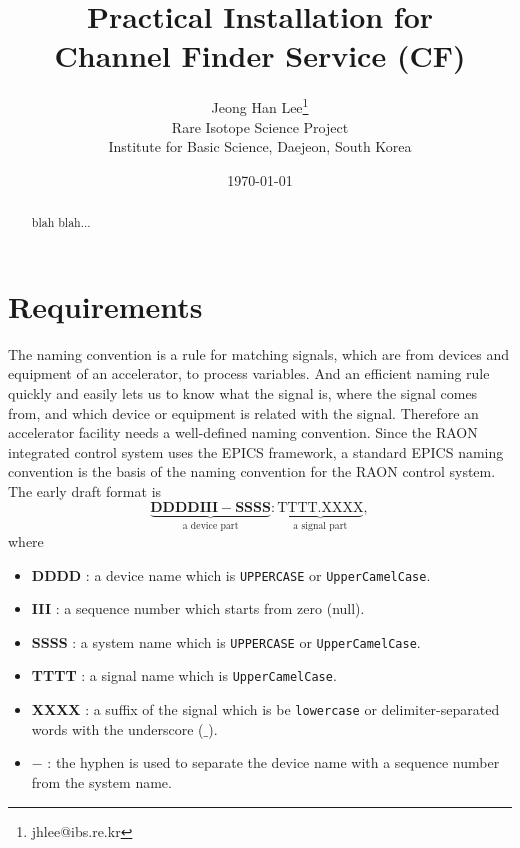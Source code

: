 \documentclass[11pt
  , a4paper
  , article
  , oneside
]{memoir}
\begin{document}
\newcommand{\technumber}{
  RAON Control-Document Series\\
  Revision : v0.2,   Release : --, 2014}
\title{\textbf{Practical Installation for \\Channel Finder Service (CF)}}

\author{Jeong Han Lee\thanks{jhlee@ibs.re.kr} \\
  Rare Isotope Science Project\\
  Institute for Basic Science, Daejeon, South Korea
}
\date{\today}

\renewcommand{\maketitlehooka}{\begin{flushright}\textsf{\technumber}\end{flushright}}

\maketitle

\begin{abstract}
blah blah...
\end{abstract}



\chapter{Requirements}

The naming convention is a rule for matching signals, which are from devices and equipment of an accelerator, to process variables. And an efficient naming rule quickly and easily lets us to know what the signal is, where the signal comes from, and which device or equipment is related with the signal. Therefore an accelerator facility needs a well-defined naming convention. Since the RAON integrated control system uses the EPICS framework, a standard EPICS naming convention is the basis of the naming convention for the RAON control system. The early draft format is
\begin{equation*}
\underbrace{\mathbf{DDDDIII-SSSS}}_\text{a device part}\mathbf{:}\underbrace{\mathrm{TTTT.XXXX}}_\text{a signal part},
\end{equation*} 
where 

\begin{itemize}
\item \textbf{DDDD} : a device name which is \texttt{UPPERCASE} or \texttt{UpperCamelCase}. 
\item \textbf{III}  : a sequence number which starts from zero (null). 
\item \textbf{SSSS} : a system name which is \texttt{UPPERCASE} or \texttt{UpperCamelCase}.
\item \textbf{TTTT} : a signal name which is \texttt{UpperCamelCase}.
\item \textbf{XXXX} : a suffix of the signal which is be \texttt{lowercase} or delimiter-separated words with the underscore ($\_$).
\item $\mathbf{-}$  : the hyphen is used to separate the device name with a sequence number from the system name.
\end{itemize}
\end{document}
